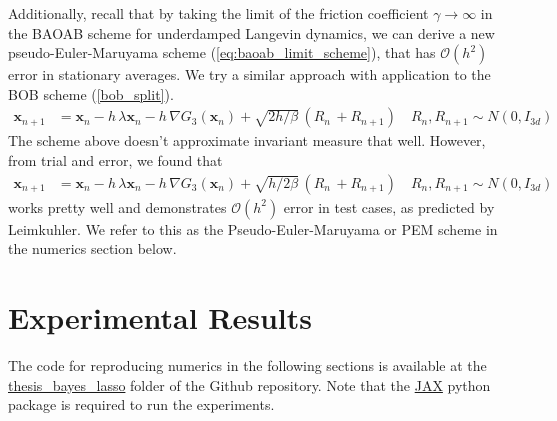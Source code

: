 \documentclass[11pt, twoside]{report}
\renewcommand{\vec}[1]{{\mathbf{#1}}}
\begin{document}
Additionally, recall that by taking the limit of the friction coefficient $\gamma \to \infty$ in the BAOAB scheme for underdamped Langevin dynamics, we can derive a new pseudo-Euler-Maruyama scheme (\ref{eq:baoab_limit_scheme}), that has $\mathcal{O}(h^2)$ error in stationary averages\cite{leimkuhler2013rational}. We try a similar approach with application to the BOB scheme (\ref{bob_split}).
\begin{equation} 
\begin{split} 
\vec x_{n+1}&=\vec x_{n} - h \,\lambda \vec x_{n} - h\,\nabla G_{3}(\vec x_n) +\sqrt{2h/\beta} \, (R_n\, + R_{n+1}) \quad R_n, R_{n+1} \sim N(0,I_{3d})
\label{pseudo-euler}
\end{split}
\end{equation}
The scheme above doesn't approximate invariant measure that well. However, from trial and error, we found that
\begin{equation}
\begin{aligned}
\vec x_{n+1}&=\vec x_{n} - h \,\lambda \vec x_{n} - h\,\nabla G_{3}(\vec x_n) +\sqrt{h/2\beta} \, (R_n\, + R_{n+1}) \quad R_n, R_{n+1} \sim N(0,I_{3d})
\end{aligned}
\end{equation}
works pretty well and demonstrates $\mathcal{O}(h^2)$ error in test cases, as predicted by Leimkuhler. We refer to this as the Pseudo-Euler-Maruyama or PEM scheme in the numerics section below.

\chapter{Experimental Results}
The code for reproducing numerics in the following sections is available at the \href{https://github.com/icheltso/thesis/tree/main/thesis\_bayes\_lasso}{thesis\_bayes\_lasso} folder of the Github repository. Note that the \href{https://docs.jax.dev/en/latest/installation.html#installation}{JAX} python package is required to run the experiments.
\end{document}
